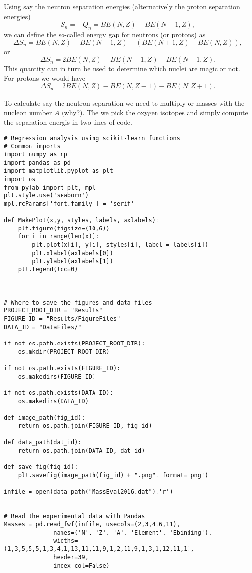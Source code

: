 \documentclass[%
oneside,                 %
final,                   %
10pt]{article}
\begin{document}
Using say the neutron separation energies (alternatively the proton separation energies)
\[
S_n= -Q_n= BE(N,Z)-BE(N-1,Z),
\]
we can define the so-called energy gap for neutrons (or protons) as 
\[
\Delta S_n= BE(N,Z)-BE(N-1,Z)-\left(BE(N+1,Z)-BE(N,Z)\right),
\]
or 
\[
\Delta S_n= 2BE(N,Z)-BE(N-1,Z)-BE(N+1,Z).
\]
This quantity can in turn be used to determine which nuclei are magic or not. 
For protons we would have 
\[
\Delta S_p= 2BE(N,Z)-BE(N,Z-1)-BE(N,Z+1).
\]

To calculate say the neutron separation we need to multiply or masses with the nucleon number $A$ (why?).
The we pick the oxygen isotopes and simply compute the separation energis in two lines of code. 
\begin{verbatim}
# Regression analysis using scikit-learn functions
# Common imports
import numpy as np
import pandas as pd
import matplotlib.pyplot as plt
import os
from pylab import plt, mpl
plt.style.use('seaborn')
mpl.rcParams['font.family'] = 'serif'

def MakePlot(x,y, styles, labels, axlabels):
    plt.figure(figsize=(10,6))
    for i in range(len(x)):
        plt.plot(x[i], y[i], styles[i], label = labels[i])
        plt.xlabel(axlabels[0])
        plt.ylabel(axlabels[1])
    plt.legend(loc=0)



# Where to save the figures and data files
PROJECT_ROOT_DIR = "Results"
FIGURE_ID = "Results/FigureFiles"
DATA_ID = "DataFiles/"

if not os.path.exists(PROJECT_ROOT_DIR):
    os.mkdir(PROJECT_ROOT_DIR)

if not os.path.exists(FIGURE_ID):
    os.makedirs(FIGURE_ID)

if not os.path.exists(DATA_ID):
    os.makedirs(DATA_ID)

def image_path(fig_id):
    return os.path.join(FIGURE_ID, fig_id)

def data_path(dat_id):
    return os.path.join(DATA_ID, dat_id)

def save_fig(fig_id):
    plt.savefig(image_path(fig_id) + ".png", format='png')

infile = open(data_path("MassEval2016.dat"),'r')


# Read the experimental data with Pandas
Masses = pd.read_fwf(infile, usecols=(2,3,4,6,11),
              names=('N', 'Z', 'A', 'Element', 'Ebinding'),
              widths=(1,3,5,5,5,1,3,4,1,13,11,11,9,1,2,11,9,1,3,1,12,11,1),
              header=39,
              index_col=False)


\end{verbatim}
\end{document}
